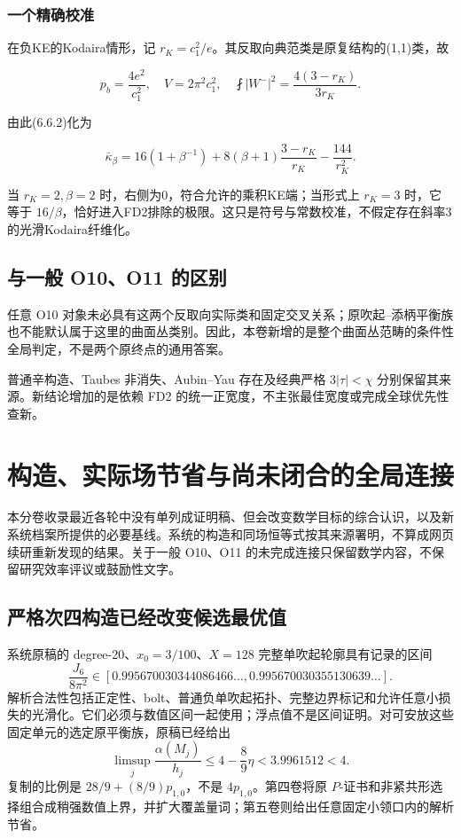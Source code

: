 \documentclass[UTF8,11pt,openany,fontset=none]{ctexbook}
\theoremstyle{definition}
\theoremstyle{remark}
\begin{document}
\subsection{一个精确校准}\label{v6-ux4e00ux4e2aux7cbeux786eux6821ux51c6}

在负KE的Kodaira情形，记 \(r_K=c_1^2/e\)。其反取向典范类是原复结构的(1,1)类，故

\[
p_b=\frac{4e^2}{c_1^2},\quad
V=2\pi^2 c_1^2,\quad
\fint|W^-|^2=\frac{4(3-r_K)}{3r_K}.
\]

由此(6.6.2)化为

\[
\bar\kappa_\beta
=16(1+\beta^{-1})
+8(\beta+1)\frac{3-r_K}{r_K}
-\frac{144}{r_K^2}.
\tag{6.7.2}
\]

当 \(r_K=2,\beta=2\) 时，右侧为0，符合允许的乘积KE端；当形式上 \(r_K=3\) 时，它等于 \(16/\beta\)，恰好进入FD2排除的极限。这只是符号与常数校准，不假定存在斜率3的光滑Kodaira纤维化。

\section{与一般 O10、O11 的区别}\label{v6-ux4e0eux4e00ux822c-o10o11-ux7684ux533aux522b}

任意 O10 对象未必具有这两个反取向实际类和固定交叉关系；原吹起--添柄平衡族也不能默认属于这里的曲面丛类别。因此，本卷新增的是整个曲面丛范畴的条件性全局判定，不是两个原终点的通用答案。

普通辛构造、Taubes 非消失、Aubin--Yau 存在及经典严格 \(3|\tau|<\chi\) 分别保留其来源。新结论增加的是依赖 FD2 的统一正宽度，不主张最佳宽度或完成全球优先性查新。\cite{Thurston1976,Taubes1994,CataneseRollenske}


\chapter{构造、实际场节省与尚未闭合的全局连接}
本分卷收录最近各轮中没有单列成证明稿、但会改变数学目标的综合认识，以及新系统档案所提供的必要基线。系统的构造和同场恒等式按其来源署明，不算成网页续研重新发现的结果。关于一般 O10、O11 的未完成连接只保留数学内容，不保留研究效率评议或鼓励性文字。\cite{B01,B02,B03}

\section{严格次四构造已经改变候选最优值}\label{v7-ux4e25ux683cux6b21ux56dbux6784ux9020ux5df2ux7ecfux6539ux53d8ux5019ux9009ux6700ux4f18ux503c}

系统原稿的 degree-20、\(x_0=3/100\)、\(X=128\) 完整单吹起轮廓具有记录的区间 \[
 \frac{J_6}{8\pi^2}\in
 [0.995670030344086466\ldots,
  0.995670030355130639\ldots].
\tag{7.1}
\] 解析合法性包括正定性、bolt、普通负单吹起拓扑、完整边界标记和允许任意小损失的光滑化。它们必须与数值区间一起使用；浮点值不是区间证明。对可安放这些固定单元的选定原平衡族，原稿已经给出 \[
 \limsup_j\frac{\alpha(M_j)}{h_j}
 \le4-\frac89\eta<3.9961512<4.
\tag{7.2}
\] 复制的比例是 \(28/9+(8/9)p_{1,0}\)，不是 \(4p_{1,0}\)。第四卷将原 \(P\)-证书和非紧共形选择组合成稍强数值上界，并扩大覆盖量词；第五卷则给出任意固定小领口内的解析节省。
\end{document}
